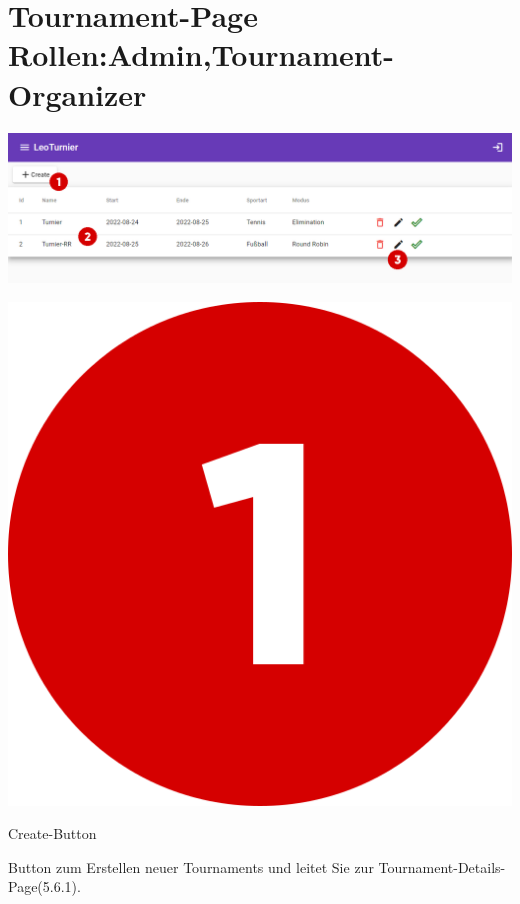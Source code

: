 \newpage
\section{Tournament-Page Rollen:Admin,Tournament-Organizer}
\includegraphics[scale=0.4]{pics/user-guide/tournament-overview-page.PNG}

\includegraphics[scale=0.05]{pics/user-guide/numbers/number-1.png} \begin{LARGE} Create-Button \end{LARGE}

Button zum Erstellen neuer Tournaments und leitet Sie zur Tournament-Details-Page(5.6.1).

